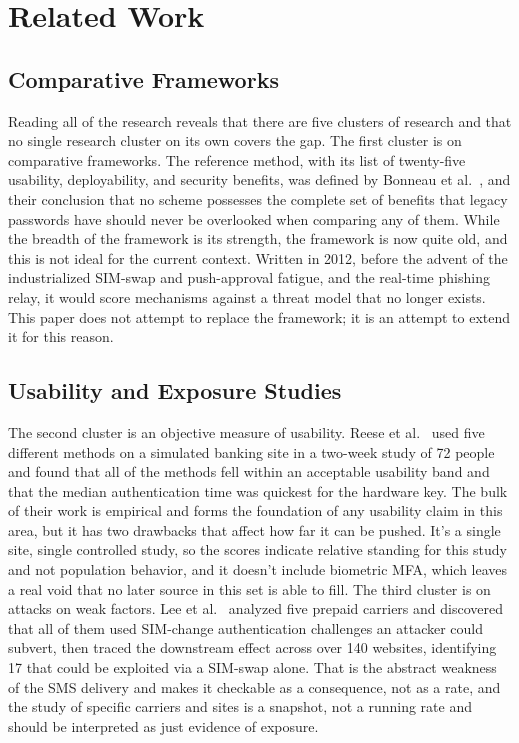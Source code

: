 \documentclass[sigconf]{acmart}
\begin{document}
\section{Related Work}

\subsection{Comparative Frameworks}

Reading all of the research reveals that there are five clusters of research and that no single research cluster on its own covers the gap. The first cluster is on comparative
frameworks. The reference method, with its list of twenty-five usability, deployability, and
security benefits, was defined by Bonneau et al.~\cite{bonneau:2012:quest}, and their conclusion
that no scheme possesses the complete set of benefits that legacy passwords have should never be
overlooked when comparing any of them. While the breadth of the framework is its strength, the
framework is now quite old, and this is not ideal for the current context. Written in 2012, before
the advent of the industrialized SIM-swap and push-approval fatigue, and the real-time phishing
relay, it would score mechanisms against a threat model that no longer exists. This
paper does not attempt to replace the framework; it is an attempt to extend it for this reason.

\subsection{Usability and Exposure Studies}

The second cluster is an objective measure of usability. Reese et al.~\cite{reese:2019:2fa} used five different methods on a simulated banking site in a two-week study of 72 people and found that all of the methods fell within an acceptable usability band and that the median authentication time was quickest for the hardware key. The bulk of their work is empirical and forms the foundation of any usability claim in this area, but it has two drawbacks that affect how far it can be pushed. It's a single site, single controlled study, so the scores indicate relative standing for this study and not population behavior, and it doesn't include biometric MFA, which leaves a real void that no later source in this set is able to fill. The third cluster is on attacks on weak factors. Lee et al.~\cite{lee:2020:simswap} analyzed five prepaid carriers and discovered that all of them used SIM-change authentication challenges an attacker could subvert, then traced the downstream effect across over 140 websites, identifying 17 that could be exploited via a SIM-swap alone. That is the abstract weakness of the SMS delivery and makes it checkable as a consequence, not as a rate, and the study of specific carriers and sites is a snapshot, not a running rate and should be interpreted as just evidence of exposure.
\end{document}

